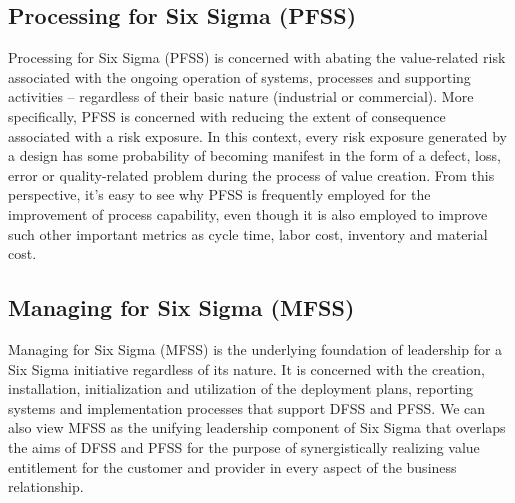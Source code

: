 \documentclass[11pt]{article} %
\begin{document}
\subsection{Processing for Six Sigma (PFSS)}
Processing for Six Sigma (PFSS) is concerned with abating the value-related risk associated with the ongoing operation of systems, processes and supporting activities – regardless of their basic nature (industrial or commercial).  More specifically, PFSS is concerned with reducing the extent of consequence associated with a risk exposure.  In this context, every risk exposure generated by a design has some probability of becoming manifest in the form of a defect, loss, error or quality-related problem during the process of value creation.  From this perspective, it’s easy to see why PFSS is frequently employed for the improvement of process capability, even though it is also employed to improve such other important metrics as cycle time, labor cost, inventory and material cost.

\subsection{Managing for Six Sigma (MFSS)}
Managing for Six Sigma (MFSS) is the underlying foundation of leadership for a Six Sigma initiative regardless of its nature.  It is concerned with the creation, installation, initialization and utilization of the deployment plans, reporting systems and implementation processes that support DFSS and PFSS.  We can also view MFSS as the unifying leadership component of Six Sigma that overlaps the aims of DFSS and PFSS for the purpose of synergistically realizing value entitlement for the customer and provider in every aspect of the business relationship.
\end{document}
